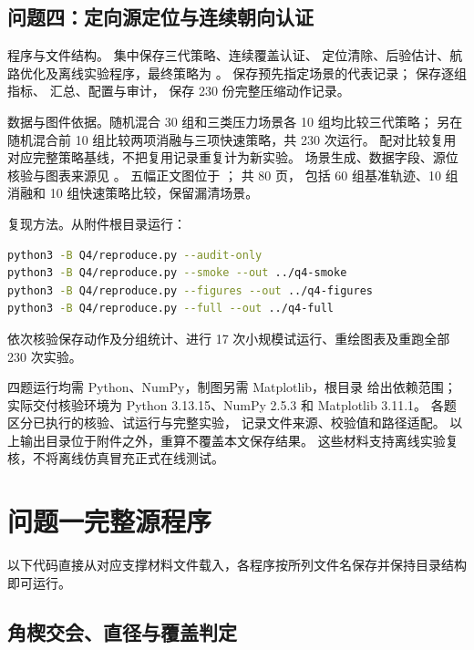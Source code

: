 \begin{appendices}
\subsection{问题四：定向源定位与连续朝向认证}
{\heiti 程序与文件结构。} 集中保存三代策略、连续覆盖认证、
定位清除、后验估计、航路优化及离线实验程序，最终策略为 。
 保存预先指定场景的代表记录； 保存逐组指标、
汇总、配置与审计， 保存 230 份完整压缩动作记录。

{\heiti 数据与图件依据。}随机混合 30 组和三类压力场景各 10 组均比较三代策略；
另在随机混合前 10 组比较两项消融与三项快速策略，共 230 次运行。
配对比较复用对应完整策略基线，不把复用记录重复计为新实验。
场景生成、数据字段、源位核验与图表来源见 。
五幅正文图位于 ； 共 80 页，
包括 60 组基准轨迹、10 组消融和 10 组快速策略比较，保留漏清场景。

{\heiti 复现方法。}从附件根目录运行：
\begin{lstlisting}[language=bash,caption={问题四的核验与复现入口}]
python3 -B Q4/reproduce.py --audit-only
python3 -B Q4/reproduce.py --smoke --out ../q4-smoke
python3 -B Q4/reproduce.py --figures --out ../q4-figures
python3 -B Q4/reproduce.py --full --out ../q4-full
\end{lstlisting}
依次核验保存动作及分组统计、进行 17 次小规模试运行、重绘图表及重跑全部 230 次实验。

四题运行均需 Python、NumPy，制图另需 Matplotlib，根目录 
给出依赖范围；实际交付核验环境为 Python 3.13.15、NumPy 2.5.3 和 Matplotlib 3.11.1。
各题  区分已执行的核验、试运行与完整实验，
 记录文件来源、校验值和路径适配。
以上输出目录位于附件之外，重算不覆盖本文保存结果。
这些材料支持离线实验复核，不将离线仿真冒充正式在线测试。

\section{问题一完整源程序}\label{app:code}
以下代码直接从对应支撑材料文件载入，各程序按所列文件名保存并保持目录结构即可运行。
\subsection{角楔交会、直径与覆盖判定}



\end{appendices}
